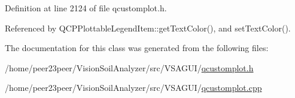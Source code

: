 Definition at line 2124 of file qcustomplot.\+h.



Referenced by Q\+C\+P\+Plottable\+Legend\+Item\+::get\+Text\+Color(), and set\+Text\+Color().



The documentation for this class was generated from the following files\+:\begin{DoxyCompactItemize}
\item 
/home/peer23peer/\+Vision\+Soil\+Analyzer/src/\+V\+S\+A\+G\+U\+I/\hyperlink{qcustomplot_8h}{qcustomplot.\+h}\item 
/home/peer23peer/\+Vision\+Soil\+Analyzer/src/\+V\+S\+A\+G\+U\+I/\hyperlink{qcustomplot_8cpp}{qcustomplot.\+cpp}\end{DoxyCompactItemize}
